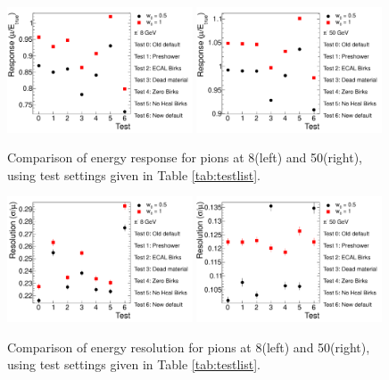 \begin{figure}[hbtp]
\begin{center}
\includegraphics[width=0.49\textwidth]{figures/hcal_test_8gev_mu_tot.pdf}
\includegraphics[width=0.49\textwidth]{figures/hcal_test_50gev_mu_tot.pdf}
\caption{Comparison of energy response for pions at 8\GeV (left) and 50\GeV (right), using test settings given in Table \ref{tab:testlist}.}
\label{fig:testresp}
\end{center}
\end{figure}

\begin{figure}[hbtp]
\begin{center}
\includegraphics[width=0.49\textwidth]{figures/hcal_test_8gev_sigma_tot.pdf}
\includegraphics[width=0.49\textwidth]{figures/hcal_test_50gev_sigma_tot.pdf}
\caption{Comparison of energy resolution for pions at 8\GeV (left) and 50\GeV (right), using test settings given in Table \ref{tab:testlist}.}
\label{fig:testreso}
\end{center}
\end{figure}

